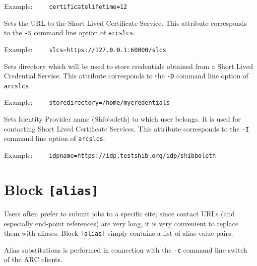 Example:
\verb#    certificatelifetime=12#

{}
\hspace*{0.5cm}
\begin{shaded}
\end{shaded}

Sets the URL to the Short Lived Certificate Service. This attribute
corresponds to the \verb#-S# command line option of \texttt{arcslcs}.

Example:
\verb#    slcs=https://127.0.0.1:60000/slcs#

{}
\hspace*{0.5cm}
\begin{shaded}
\end{shaded}

Sets directory which will be used to store credentials obtained from a Short
Lived Credential Servise. This attribute
corresponds to the \verb#-D# command line option of \texttt{arcslcs}.

Example:
\verb#    storedirectory=/home/mycredentials#

{}
\hspace*{0.5cm}
\begin{shaded}
\end{shaded}

Sets Identity Provider name (Shibboleth) to which user belongs. It is used for
contacting Short Lived Certificate Services. This attribute
corresponds to the \verb#-I# command line option of \texttt{arcslcs}.

Example:
\verb#    idpname=https://idp.testshib.org/idp/shibboleth#


\section{Block \texttt{[alias]}}

Users often prefer to submit jobs to a specific site; since contact URLs (and
especially end-point references) are very long, it is very convenient to replace
them with aliases. Block \texttt{[alias]} simply contains a list of
alias-value pairs.

 Alias substitutions is performed in connection with the \verb#-c# command line
 switch of the ARC clients.

